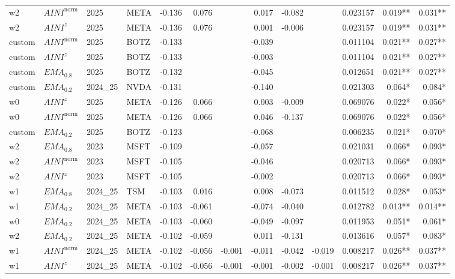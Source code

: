 \begin{longtable}{@{}llllrrrrrrrrr@{}}
w2 & $AINI^{\mathrm{norm}}$ & 2025 & META & -0.136 & 0.076 &  & 0.017 & -0.082 &  & 0.023157 & 0.019** & 0.031** \\
w2 & $AINI^{z}$ & 2025 & META & -0.136 & 0.076 &  & 0.001 & -0.006 &  & 0.023157 & 0.019** & 0.031** \\
custom & $AINI^{\mathrm{norm}}$ & 2025 & BOTZ & -0.133 &  &  & -0.039 &  &  & 0.011104 & 0.021** & 0.027** \\
custom & $AINI^{z}$ & 2025 & BOTZ & -0.133 &  &  & -0.003 &  &  & 0.011104 & 0.021** & 0.027** \\
custom & $EMA_{0.8}$ & 2025 & BOTZ & -0.132 &  &  & -0.045 &  &  & 0.012651 & 0.021** & 0.027** \\
custom & $EMA_{0.2}$ & 2024\_25 & NVDA & -0.131 &  &  & -0.140 &  &  & 0.021303 & 0.064* & 0.084* \\
w0 & $AINI^{z}$ & 2025 & META & -0.126 & 0.066 &  & 0.003 & -0.009 &  & 0.069076 & 0.022* & 0.056* \\
w0 & $AINI^{\mathrm{norm}}$ & 2025 & META & -0.126 & 0.066 &  & 0.046 & -0.137 &  & 0.069076 & 0.022* & 0.056* \\
custom & $EMA_{0.2}$ & 2025 & BOTZ & -0.123 &  &  & -0.068 &  &  & 0.006235 & 0.021* & 0.070* \\
w2 & $EMA_{0.8}$ & 2023 & MSFT & -0.109 &  &  & -0.057 &  &  & 0.021031 & 0.066* & 0.093* \\
w2 & $AINI^{\mathrm{norm}}$ & 2023 & MSFT & -0.105 &  &  & -0.046 &  &  & 0.020713 & 0.066* & 0.093* \\
w2 & $AINI^{z}$ & 2023 & MSFT & -0.105 &  &  & -0.002 &  &  & 0.020713 & 0.066* & 0.093* \\
w1 & $EMA_{0.8}$ & 2024\_25 & TSM & -0.103 & 0.016 &  & 0.008 & -0.073 &  & 0.011512 & 0.028* & 0.053* \\
w1 & $EMA_{0.2}$ & 2024\_25 & META & -0.103 & -0.061 &  & -0.074 & -0.040 &  & 0.012782 & 0.013** & 0.014** \\
w0 & $EMA_{0.2}$ & 2024\_25 & META & -0.103 & -0.060 &  & -0.049 & -0.097 &  & 0.011953 & 0.051* & 0.061* \\
w2 & $EMA_{0.2}$ & 2024\_25 & META & -0.102 & -0.059 &  & 0.011 & -0.131 &  & 0.013616 & 0.057* & 0.083* \\
w1 & $AINI^{\mathrm{norm}}$ & 2024\_25 & META & -0.102 & -0.056 & -0.001 & -0.011 & -0.042 & -0.019 & 0.008217 & 0.026** & 0.037** \\
w1 & $AINI^{z}$ & 2024\_25 & META & -0.102 & -0.056 & -0.001 & -0.001 & -0.002 & -0.001 & 0.008217 & 0.026** & 0.037** \\

\end{longtable}
